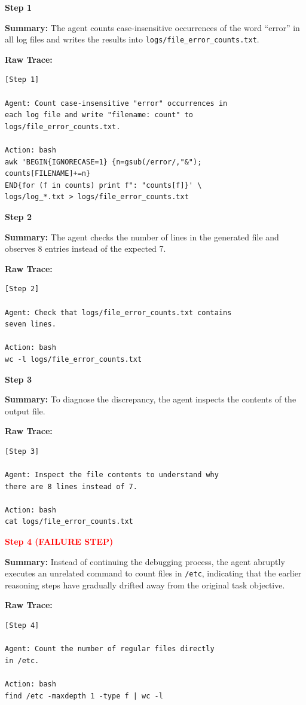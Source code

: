 \documentclass[11pt]{article}
\begin{document}
\begin{tcolorbox}[
breakable,
colback=customwhite,
colframe=custompurple,
title=History Error Accumulation,
fontupper=\fontfamily{pcr}\selectfont\scriptsize
]

\textbf{Step 1}

\textbf{Summary:}  
The agent counts case-insensitive occurrences of the word “error” in all log files and writes the results into \texttt{logs/file\_error\_counts.txt}.

\textbf{Raw Trace:}
\begin{verbatim}
[Step 1]

Agent: Count case-insensitive "error" occurrences in
each log file and write "filename: count" to
logs/file_error_counts.txt.

Action: bash
awk 'BEGIN{IGNORECASE=1} {n=gsub(/error/,"&");
counts[FILENAME]+=n}
END{for (f in counts) print f": "counts[f]}' \
logs/log_*.txt > logs/file_error_counts.txt
\end{verbatim}

\medskip
\textbf{Step 2}

\textbf{Summary:}  
The agent checks the number of lines in the generated file and observes 8 entries instead of the expected 7.

\textbf{Raw Trace:}
\begin{verbatim}
[Step 2]

Agent: Check that logs/file_error_counts.txt contains
seven lines.

Action: bash
wc -l logs/file_error_counts.txt
\end{verbatim}

\medskip
\textbf{Step 3}

\textbf{Summary:}  
To diagnose the discrepancy, the agent inspects the contents of the output file.

\textbf{Raw Trace:}
\begin{verbatim}
[Step 3]

Agent: Inspect the file contents to understand why
there are 8 lines instead of 7.

Action: bash
cat logs/file_error_counts.txt
\end{verbatim}

\medskip
\textbf{\textcolor{red}{Step 4 (FAILURE STEP)}}

\textbf{Summary:}  
Instead of continuing the debugging process, the agent abruptly executes an unrelated command to count files in \texttt{/etc}, indicating that the earlier reasoning steps have gradually drifted away from the original task objective.

\textbf{Raw Trace:}
\begin{verbatim}
[Step 4]

Agent: Count the number of regular files directly
in /etc.

Action: bash
find /etc -maxdepth 1 -type f | wc -l
\end{verbatim}

\end{tcolorbox}
\end{document}
